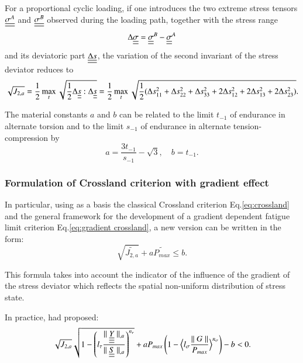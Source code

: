 \documentclass[3p,times,procedia,number]{elsarticle}
\begin{document}
For a proportional cyclic loading, if one introduces the two extreme stress tensors $\uline{\uline{\sigma^A}}$ and $\uline{\uline{\sigma^B}}$ observed during the loading path, together with the stress range 
\begin{equation}\Delta\uline{\uline{\sigma}}=\uline{\uline{\sigma}}^B-\uline{\uline{\sigma}}^A\end{equation}
and its deviatoric part $\uline{\uline{\Delta s}} $, the variation of
the second invariant of the stress deviator reduces to 
\begin{equation}\sqrt{J_{2,a}}=\frac{1}{2}\max\limits_{t}\sqrt{\frac{1}{2}\Delta\uline{\uline{s}}:\Delta\uline{\uline{s}}}=\frac{1}{2}\max\limits_{t}\sqrt{\frac{1}{2}(\Delta s_{11}^2+\Delta s_{22}^2+\Delta s_{33}^2+2\Delta s_{12}^2+2\Delta s_{13}^2+2\Delta s_{23}^2)}.\end{equation}


The material constants $a$ and $b$ can be related to  the limit $t_{-1}$ of endurance in alternate torsion and to the limit $s_{-1}$ of endurance in alternate tension-compression by
\begin{equation}
a=\frac{3 t_{-1}}{s_{-1}}-\sqrt{3},\quad 
b=t_{-1}.
\label{crossland-ab}
\end{equation}


\subsubsection{Formulation of Crossland criterion with gradient effect}

In particular, using as a basis the classical Crossland criterion Eq.\eqref{eq:crossland} and the general framework for the development of a gradient dependent fatigue limit criterion Eq.\eqref{eq:gradient crossland}, a new version can be written in the form:
\begin{equation}
\sqrt{\widetilde{J_{2,a}}}+a\widetilde{P_{max}}\leqslant b .
\end{equation}

This formula takes into account the indicator of the influence of the gradient of the stress deviator which reflects the spatial non-uniform distribution of stress state.

In practice, \cite{luu2013formulation} had proposed:
\begin{equation}
\sqrt{{J_{2,a}}}\sqrt{1-\left(l_\tau\frac{\parallel \uline{\uline{\uline{Y}}}\parallel_{,a}}{\parallel \uline{\uline{S}}\parallel_{,a}}\right)^{n_\tau}}+aP_{max}\left(1-\Big< l_\sigma\frac{\parallel G\parallel}{P_{max}}\Big>^{n_\sigma}\right)-b < 0 .
\end{equation}
\end{document}
